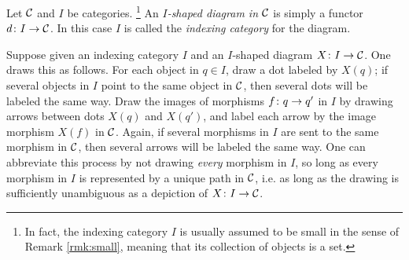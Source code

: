 \begin{definition}

Let $\mathcal{C}$ and $I$ be categories.
\footnote{In fact, the indexing category $I$ is usually assumed to be small in the sense of Remark \ref{rmk:small}, meaning that its collection of objects is a set.}
An {\em $I$-shaped diagram in $\mathcal{C}$} is simply a functor $d\colon I\rightarrow\mathcal{C}$. In this case $I$ is called the {\em indexing category} for the diagram.

\end{definition}

Suppose given an indexing category $I$ and an $I$-shaped diagram $X\colon I\rightarrow\mathcal{C}$. One draws this as follows. For each object in $q\in I$, draw a dot labeled by $X(q)$; if several objects in $I$ point to the same object in $\mathcal{C}$, then several dots will be labeled the same way. Draw the images of morphisms $f\colon q\rightarrow q'$ in $I$ by drawing arrows between dots $X(q)$ and $X(q')$, and label each arrow by the image morphism $X(f)$ in $\mathcal{C}$. Again, if several morphisms in $I$ are sent to the same morphism in $\mathcal{C}$, then several arrows will be labeled the same way. One can abbreviate this process by not drawing {\em every} morphism in $I$, so long as every morphism in $I$ is represented by a unique path in $\mathcal{C}$, i.e. as long as the drawing is sufficiently unambiguous as a depiction of $X\colon I\rightarrow\mathcal{C}$.

